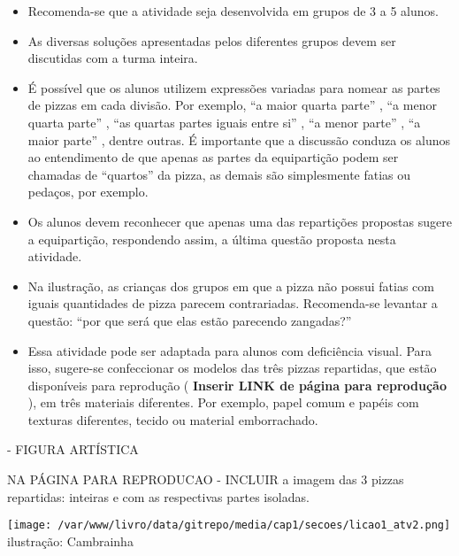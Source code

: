 \documentclass[a4paper,12pt,twoside]{book}
\begin{document}
\begin{professor*}[breakable]{}{}
\begin{itemize} %
    \item       Recomenda-se que a atividade seja desenvolvida em grupos de 3 a 5 alunos.
    \item       As diversas soluções apresentadas pelos diferentes grupos devem ser discutidas com a turma inteira. 
    \item       É possível que os alunos utilizem expressões variadas para nomear as partes de pizzas em cada divisão. Por exemplo,       ``a maior quarta parte''      ,       ``a menor quarta parte''      ,       ``as quartas partes iguais entre si''      ,       ``a menor parte''      ,       ``a maior parte''      , dentre outras. É importante que a discussão conduza os alunos ao entendimento de que apenas as partes da equipartição podem ser chamadas de       ``quartos''       da pizza, as demais são simplesmente fatias ou pedaços, por exemplo. 
    \item       Os alunos devem reconhecer que apenas uma das repartições propostas sugere a equipartição, respondendo assim, a última questão proposta nesta atividade.
    \item       Na ilustração, as crianças dos grupos em que a pizza não possui fatias com iguais quantidades de pizza parecem contrariadas. Recomenda-se levantar a questão:       ``por que será que elas estão parecendo zangadas?''
    \item       Essa atividade pode ser adaptada para alunos com deficiência visual. Para isso, sugere-se confeccionar os modelos das três pizzas repartidas, que estão disponíveis para reprodução (      {\bf Inserir LINK de página para reprodução}      ), em três materiais diferentes. Por exemplo, papel comum e papéis com texturas diferentes, tecido ou material emborrachado. 
\end{itemize} %
  
  
  \begin{imagem*}[breakable]{}{}      - FIGURA ARTÍSTICA     
    \begin{nota*}[breakable]{}{}       NA PÁGINA PARA REPRODUCAO - INCLUIR a imagem das 3 pizzas repartidas: inteiras e com as respectivas partes isoladas.      
    \end{nota*}    
    
        \texttt{[image: /var/www/livro/data/gitrepo/media/cap1/secoes/licao1\_atv2.png]}    
    ilustração: Cambrainha    
    
  \end{imagem*}  
\end{professor*}
\end{document}
